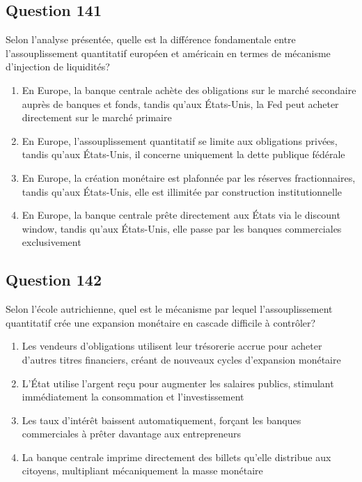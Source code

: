 \documentclass[12pt,a4paper]{article}
\begin{document}
\subsection*{Question 141}
Selon l'analyse présentée, quelle est la différence fondamentale entre l'assouplissement quantitatif européen et américain en termes de mécanisme d'injection de liquidités?

\begin{enumerate}[label=\Alph*., leftmargin=*]
\item En Europe, la banque centrale achète des obligations sur le marché secondaire auprès de banques et fonds, tandis qu'aux États-Unis, la Fed peut acheter directement sur le marché primaire
\item En Europe, l'assouplissement quantitatif se limite aux obligations privées, tandis qu'aux États-Unis, il concerne uniquement la dette publique fédérale
\item En Europe, la création monétaire est plafonnée par les réserves fractionnaires, tandis qu'aux États-Unis, elle est illimitée par construction institutionnelle
\item En Europe, la banque centrale prête directement aux États via le discount window, tandis qu'aux États-Unis, elle passe par les banques commerciales exclusivement
\end{enumerate}

\bigskip


\subsection*{Question 142}
Selon l'école autrichienne, quel est le mécanisme par lequel l'assouplissement quantitatif crée une expansion monétaire en cascade difficile à contrôler?

\begin{enumerate}[label=\Alph*., leftmargin=*]
\item Les vendeurs d'obligations utilisent leur trésorerie accrue pour acheter d'autres titres financiers, créant de nouveaux cycles d'expansion monétaire
\item L'État utilise l'argent reçu pour augmenter les salaires publics, stimulant immédiatement la consommation et l'investissement
\item Les taux d'intérêt baissent automatiquement, forçant les banques commerciales à prêter davantage aux entrepreneurs
\item La banque centrale imprime directement des billets qu'elle distribue aux citoyens, multipliant mécaniquement la masse monétaire
\end{enumerate}
\end{document}
